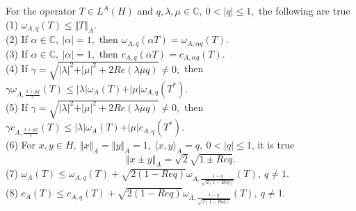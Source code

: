 \documentclass[10pt,a4paper]{amsart}
\begin{document}
\begin{theorem}
\label{thm1}
For the operator $ T\in L^{A}(H) $ and $ q,\lambda,\mu\in \mathbb{C}, \ 0<\vert q \vert\leq 1, $ the following are true  \\
(1) $ \omega_{A,q}(T)\leq \Vert T \Vert_{A}. $ \\
(2) If  $ \alpha \in \mathbb{C}, \ \vert \alpha \vert =1, $ then $ \omega_{A,q}(\alpha T)=\omega_{A,\alpha q}(T). $ \\
(3) If  $ \alpha \in \mathbb{C}, \ \vert \alpha \vert =1,$ then $ c_{A,q}(\alpha T)=c_{A,\alpha q}(T). $ \\
(4) If $  \gamma =\sqrt{\vert \lambda\vert^{2}+ \vert \mu\vert^{2}+ 2Re (\lambda \overline{\mu} q)}\neq 0, $ then $ \gamma \omega_{A,\frac{\lambda + \mu \overline{q}}{\gamma}} (T)\leq \vert \lambda\vert\omega_{A}(T)+\vert \mu\vert\omega_{A,q}(T^{*}). $  \\
(5) If $  \gamma =\sqrt{\vert \lambda\vert^{2}+ \vert \mu\vert^{2}+ 2Re (\lambda \overline{\mu} q)}\neq 0, $ then $ \gamma c_{A,\frac{\lambda + \mu \overline{q}}{\gamma} }(T)\leq \vert \lambda\vert\omega_{A}(T)+\vert \mu\vert c_{A,q}(T^{*}). $\\
(6) For $ x,y \in H, \ \Vert x \Vert_{A}=\Vert y \Vert_{A}=1, \ \langle x,y \rangle_{A}=q, \ 0<\vert q \vert \leq 1 $, it is true $$
\Vert x\pm y \Vert_{A}=\sqrt{2}\sqrt{1\pm Req}.
$$ 
(7) $ \omega_{A}(T)\leq \omega_{A, q}(T)+ \sqrt{2(1-Req)}\omega_{A,\frac{1-q}{\sqrt{2(1-Req)}}}(T), \ q\neq 1. $ \\
(8) $ c_{A}(T)\leq c_{A, q}(T)+ \sqrt{2(1-Req)}\omega_{A,\frac{1-q}{\sqrt{2(1-Req)}}}(T), \ q\neq 1 . $
\end{theorem}
\end{document}

